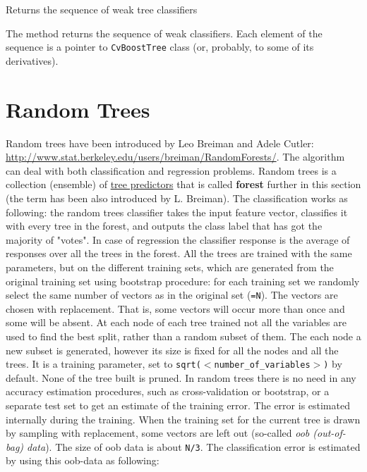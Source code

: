 
Returns the sequence of weak tree classifiers


The method returns the sequence of weak classifiers. Each element of the sequence is a pointer to \texttt{CvBoostTree} class (or, probably, to some of its derivatives).

\section{Random Trees}


Random trees have been introduced by Leo Breiman and Adele Cutler: \url{http://www.stat.berkeley.edu/users/breiman/RandomForests/}. The algorithm can deal with both classification and regression problems. Random trees is a collection (ensemble) of \href{#DecisionTrees}{tree predictors} that is called \textbf{forest} further in this section (the term has been also introduced by L. Breiman). The classification works as following: the random trees classifier takes the input feature vector, classifies it with every tree in the forest, and outputs the class label that has got the majority of "votes". In case of regression the classifier response is the average of responses over all the trees in the forest.
\newline
\newline
All the trees are trained with the same parameters, but on the different training sets, which are generated from the original training set using bootstrap procedure: for each training set we randomly select the same number of vectors as in the original set (\texttt{=N}). The vectors are chosen with replacement. That is, some vectors will occur more than once and some will be absent. At each node of each tree trained not all the variables are used to find the best split, rather than a random subset of them. The each node a new subset is generated, however its size is fixed for all the nodes and all the trees. It is a training parameter, set to \texttt{sqrt($<$number\_of\_variables$>$)} by default. None of the tree built is pruned.
\newline
\newline
In random trees there is no need in any accuracy estimation procedures, such as cross-validation or bootstrap, or a separate test set to get an estimate of the training error. The error is estimated internally during the training. When the training set for the current tree is drawn by sampling with replacement, some vectors are left out (so-called \emph{oob (out-of-bag) data}). The size of oob data is about \texttt{N/3}. The classification error is estimated by using this oob-data as following:
